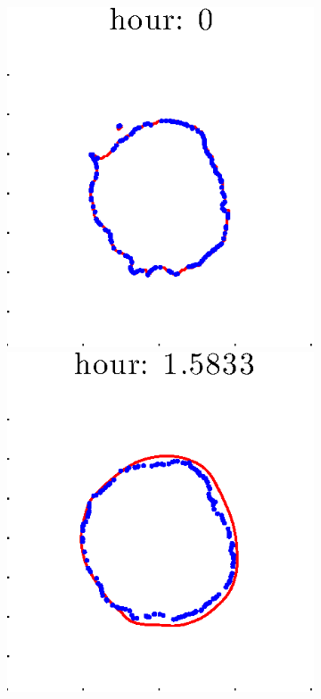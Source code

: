 \documentclass[12pt]{article}
\begin{document}
\begin{figure}[h!]
\begin{subfigure}[b]{.3\textwidth}
	\end{subfigure}
	\begin{subfigure}[b]{.3\textwidth}
	\centering
		\includegraphics[height=.15\textheight]{Pos0/full/second1.eps}
		\includegraphics[height=.15\textheight]{Pos0/full/second2.eps}

\end{subfigure}
\end{figure}
\end{document}
